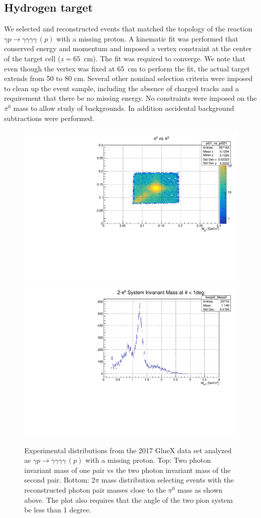 \subsection{Hydrogen target}
  We selected and reconstructed events that matched the
topology of the reaction $\gamma p\rightarrow \gamma \gamma \gamma
\gamma\, (p)$ with a missing proton. A kinematic fit was performed
that conserved energy and momentum and imposed a vertex constraint at the center of the target cell ($z=65$~cm). The fit was required to converge. We note
that even though the vertex was
fixed at 65~cm to perform the fit, the actual target extends from 50
to 80 cm. Several other nominal selection criteria were imposed to clean up
the event sample, including the absence of charged tracks and a requirement
that there be no missing
energy. No constraints were imposed on the $\pi^0$ mass to allow study of
backgrounds. In addition accidental background subtractions were performed.
\begin{figure}[tph] 
\centering
\includegraphics[width=4.75in]{figures/pi0VSpi0.pdf} \\
\centering
\includegraphics[width=4.75in]{figures/TwoPiInvMass.pdf}
\caption{Experimental distributions from the 2017 GlueX data set analyzed as $\gamma p\rightarrow \gamma \gamma \gamma \gamma\, (p)$ with a missing proton. Top: Two photon invariant mass of one pair vs the two photon invariant mass of the second pair. Bottom: 2$\pi$ mass distribution selecting events with the reconstructed photon pair masses close to the $\pi^0$ mass as  shown above. The plot also requires that the angle of the two pion system be less than 1 degree.
\label{fig:TwoPiInvMass}}
\end{figure}
